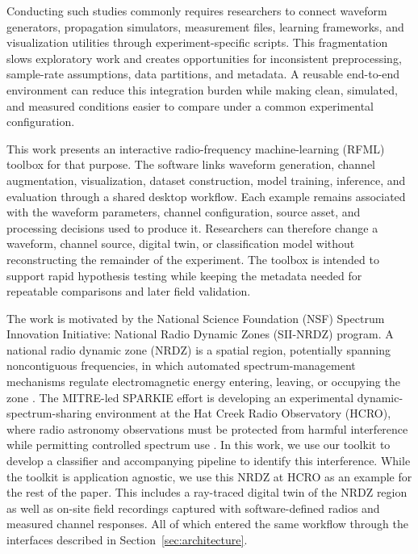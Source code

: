 \documentclass[10pt,conference,letterpaper]{IEEEtran}
\begin{document}
Conducting such studies commonly requires researchers to connect waveform generators, propagation simulators, measurement files, learning frameworks, and visualization utilities through experiment-specific scripts. This fragmentation slows exploratory work and creates opportunities for inconsistent preprocessing, sample-rate assumptions, data partitions, and metadata. A reusable end-to-end environment can reduce this integration burden while making clean, simulated, and measured conditions easier to compare under a common experimental configuration.

This work presents an interactive radio-frequency machine-learning (RFML) toolbox for that purpose. The software links waveform generation, channel augmentation, visualization, dataset construction, model training, inference, and evaluation through a shared desktop workflow. Each example remains associated with the waveform parameters, channel configuration, source asset, and processing decisions used to produce it. Researchers can therefore change a waveform, channel source, digital twin, or classification model without reconstructing the remainder of the experiment. The toolbox is intended to support rapid hypothesis testing while keeping the metadata needed for repeatable comparisons and later field validation.

The work is motivated by the National Science Foundation (NSF) Spectrum Innovation Initiative: National Radio Dynamic Zones (SII-NRDZ) program. A national radio dynamic zone (NRDZ) is a spatial region, potentially spanning noncontiguous frequencies, in which automated spectrum-management mechanisms regulate electromagnetic energy entering, leaving, or occupying the zone \cite{nsfnrdz}. The MITRE-led SPARKIE effort is developing an experimental dynamic-spectrum-sharing environment at the Hat Creek Radio Observatory (HCRO), where radio astronomy observations must be protected from harmful interference while permitting controlled spectrum use \cite{mitrenrdz}. In this work, we use our toolkit to develop a classifier and accompanying pipeline to identify this interference. While the toolkit is application agnostic, we use this NRDZ at HCRO as an example for the rest of the paper. This includes a ray-traced digital twin of the NRDZ region as well as on-site field recordings captured with software-defined radios and measured channel responses. All of which entered the same workflow through the interfaces described in Section~\ref{sec:architecture}.
\end{document}
